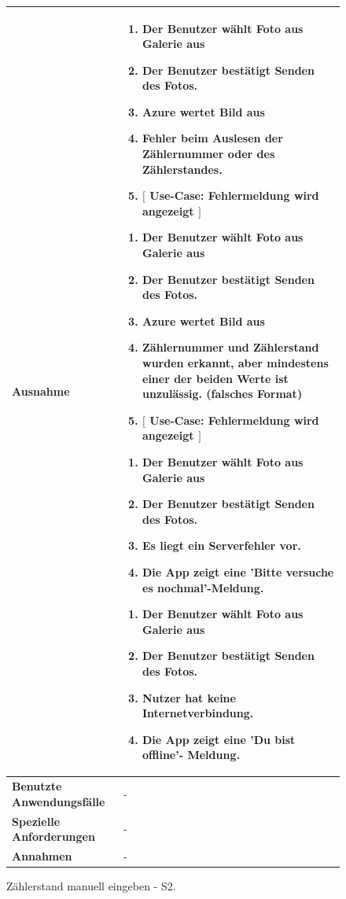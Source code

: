 \begin{figure}[h]
	\centering
	\begin{tabularx}{\textwidth}{ X | X } \hline
		\textbf{Ausnahme} &
		\begin{enumerate}
			\item Der Benutzer wählt Foto aus Galerie aus
			\item Der Benutzer bestätigt Senden des Fotos. 
			\item Azure wertet Bild aus 
			\item Fehler beim Auslesen der Zählernummer oder des Zählerstandes. 
			\item $\lbrack$ Use-Case: Fehlermeldung wird angezeigt $\rbrack$ 
		\end{enumerate} 
		\begin{enumerate}
			\item Der Benutzer wählt Foto aus Galerie aus
			\item Der Benutzer bestätigt Senden des Fotos. 
			\item Azure wertet Bild aus 
			\item Zählernummer und Zählerstand wurden erkannt, aber mindestens einer der beiden Werte ist unzulässig. (falsches Format) 
			\item $\lbrack$ Use-Case: Fehlermeldung wird angezeigt $\rbrack$ 
		\end{enumerate}  
		\begin{enumerate}
			\item Der Benutzer wählt Foto aus Galerie aus
			\item Der Benutzer bestätigt Senden des Fotos. 
			\item Es liegt ein Serverfehler vor. 
			\item Die App zeigt eine ’Bitte versuche es nochmal’-Meldung. 
		\end{enumerate}
		\begin{enumerate}
			\item Der Benutzer wählt Foto aus Galerie aus 
			\item Der Benutzer bestätigt Senden des Fotos. 
			\item Nutzer hat keine Internetverbindung. 
			\item Die App zeigt eine ’Du bist offline’- Meldung.
		\end{enumerate} \\ \hline
		\textbf{Benutzte Anwendungsfälle} & - \\ \hline
		\textbf{Spezielle Anforderungen} & - \\ \hline
		\textbf{Annahmen} & - \\ \hline
	\end{tabularx}
	\caption{Zählerstand manuell eingeben - S2.}
	\label{fig:anwendungsfall-server-tabelle-xx-1}
\end{figure}

